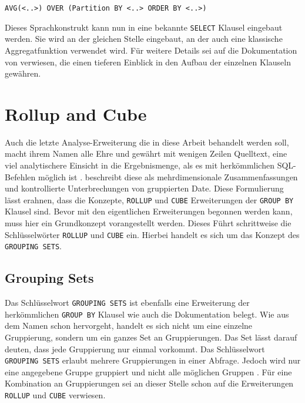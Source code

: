 \texttt{AVG(<..>) OVER (Partition BY <..> ORDER BY <..>)} \\ \citep[Analytic
Functions]{Nuijten2023}

Dieses Sprachkonstrukt kann nun in eine bekannte \texttt{SELECT} Klausel
eingebaut werden. Sie wird an der gleichen Stelle eingebaut, an der auch eine
klassische Aggregatfunktion verwendet wird. Für weitere Details sei auf die Dokumentation
von \citet{oracle} verwiesen, die einen tieferen Einblick in den Aufbau der einzelnen
Klauseln gewähren.


\section{Rollup and Cube}
\label{sec:rollup_and_cube} Auch die letzte Analyse-Erweiterung die in diese
Arbeit behandelt werden soll, macht ihrem Namen alle Ehre und gewährt mit wenigen
Zeilen Quelltext, eine viel analytischere Einsicht in die Ergebnismenge, als es mit
herkömmlichen SQL-Befehlen möglich ist \citep[Kapitel 7.2.3]{melton2002advanced}.
\citet[Kapitel 7.2.3]{melton2002advanced} beschreibt diese als mehrdimensionale
Zusammenfassungen und kontrollierte Unterbrechungen von gruppierten Date. Diese Formulierung
lässt erahnen, dass die Konzepte, \texttt{ROLLUP} und \texttt{CUBE} Erweiterungen
der \texttt{GROUP BY} Klausel sind. Bevor mit den eigentlichen Erweiterungen begonnen
werden kann, muss hier ein Grundkonzept vorangestellt werden. Dieses Führt schrittweise
die Schlüsselwörter \texttt{ROLLUP} und \texttt{CUBE} ein. Hierbei handelt es
sich um das Konzept des \texttt{GROUPING SETS}.

\subsection{Grouping Sets}
\label{subsec:grouping_sets} Das Schlüsselwort \texttt{GROUPING SETS} ist
ebenfalls eine Erweiterung der herkömmlichen \texttt{GROUP BY} Klausel wie auch die
\citet{oracle16} Dokumentation belegt. Wie aus dem Namen schon hervorgeht,
handelt es sich nicht um eine einzelne Gruppierung, sondern um ein ganzes Set an
Gruppierungen. Das Set lässt darauf deuten, dass jede Gruppierung nur einmal vorkommt.
Das Schlüsselwort \texttt{GROUPING SETS} erlaubt mehrere Gruppierungen in einer Abfrage.
Jedoch wird nur eine angegebene Gruppe gruppiert und nicht alle möglichen
Gruppen \citet{oracle16}. Für eine Kombination an Gruppierungen sei an dieser
Stelle schon auf die Erweiterungen \texttt{ROLLUP} und \texttt{CUBE} verwiesen.

